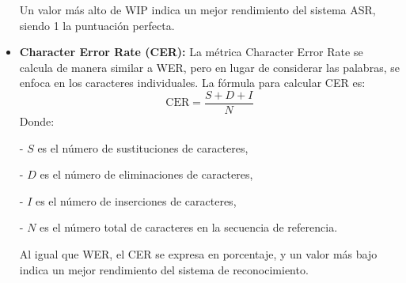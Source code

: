 \documentclass[conference]{IEEEtran}
\begin{document}
\begin{itemize}
    Un valor más alto de WIP indica un mejor rendimiento del sistema ASR, siendo 1 la puntuación perfecta.
    \item \textbf{Character Error Rate (CER):} La métrica Character Error Rate se calcula de manera similar a WER, pero en lugar de considerar las palabras, se enfoca en los caracteres individuales. La fórmula para calcular CER es:
    \begin{equation}
        \text{CER} = \frac{S + D + I}{N}
    \end{equation}
    Donde:
    
    - \( S \) es el número de sustituciones de caracteres,
    
    - \( D \) es el número de eliminaciones de caracteres,
    
    - \( I \) es el número de inserciones de caracteres,
    
    - \( N \) es el número total de caracteres en la secuencia de referencia.
    
    Al igual que WER, el CER se expresa en porcentaje, y un valor más bajo indica un mejor rendimiento del sistema de reconocimiento.
\end{itemize}
\end{document}
